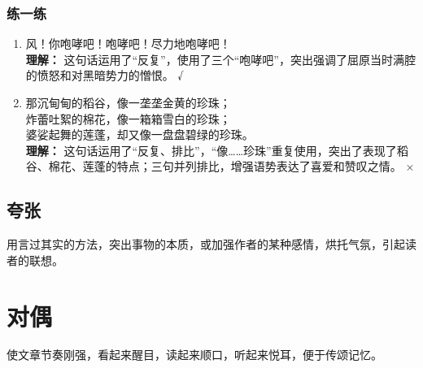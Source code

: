 \subsubsection*{练一练}

\begin{enumerate}
    \item 风！你咆哮吧！咆哮吧！尽力地咆哮吧！ \\
    \textbf{理解：} 这句话运用了“反复”，使用了三个“咆哮吧”，突出强调了屈原当时满腔的愤怒和对黑暗势力的憎恨。 \hfill √

    \item 那沉甸甸的稻谷，像一垄垄金黄的珍珠； \\
    炸蕾吐絮的棉花，像一箱箱雪白的珍珠； \\
    婆娑起舞的莲蓬，却又像一盘盘碧绿的珍珠。 \\
    \textbf{理解：} 这句话运用了“反复、排比”，“像……珍珠”重复使用，突出了表现了稻谷、棉花、莲蓬的特点；三句并列排比，增强语势表达了喜爱和赞叹之情。 \hfill ×
\end{enumerate}


\subsection*{夸张}

用言过其实的方法，突出事物的本质，或加强作者的某种感情，烘托气氛，引起读者的联想。


\section*{对偶}

使文章节奏刚强，看起来醒目，读起来顺口，听起来悦耳，便于传颂记忆。